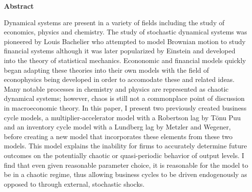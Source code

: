 \thispagestyle{plain}
\begin{center}
	\vspace*{\fill}
	\textbf{Abstract}\\
\end{center}
	Dynamical systems are present in a variety of fields including the study of economics, physics and chemistry. The study of stochastic dynamical systems was pioneered by Louis Bachelier\autocite{Bachelier1900} who attempted to model Brownian motion to study financial systems although it was later popularized by Einstein and developed into the theory of statistical mechanics. Econonomic and financial models quickly began adapting these theories into their own models with the field of econophysics being developed in order to accomodate these and related ideas. Many notable processes in chemistry and physics are represented as chaotic dynamical systems; however, chaos is still not a commonplace point of discussion in macroeconomic theory. In this paper, I present two previously created business cycle models, a multiplier-accelerator model with a Robertson lag by T\"onu Puu and an inventory cycle model with a Lundberg lag by Metzler and Wegener, before creating a new model that incorporates these elements from these two models. This model explains the inability for firms to accurately determine future outcomes on the potentially chaotic or quasi-periodic behavior of output levels. I find that even given reasonable parameter choice, it is reasonable for the model to be in a chaotic regime, thus allowing business cycles to be driven endogenously as opposed to through external, stochastic shocks.
	\vspace*{\fill}
\pagebreak